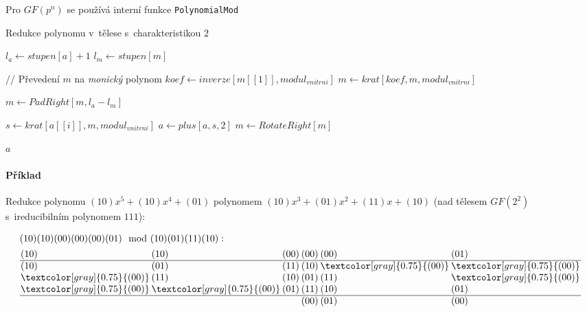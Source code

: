 \documentclass[thesis=M,czech,hidelinks]{FITthesis}[2012/06/26]
\newcommand{\0}{{\textcolor[gray]{0.75}{0}}}
\newenvironment{algoritmus}{
    \floatname{algorithm}{Algoritmus}
    \begin{algorithm}
}{\end{algorithm}}
\begin{document}
Pro $GF(p^n)$ se používá interní funkce \texttt{PolynomialMod}

\begin{algoritmus}[!ht]
    \caption{Redukce polynomu v~tělese s~charakteristikou $2$}
    \begin{algorithmic}[1]
        \State $ l_a \gets stupen[a] + 1 $
        \State $ l_m \gets stupen[m]$

        // Převedení $m$ na \emph{monický} polynom
        \State $ koef \gets inverze[ m[[1]], modul_{vnitrni} ] $
        \State $ m \gets krat[ koef, m, modul_{vnitrni} ] $

        \hfil
        \State $ m \gets PadRight[ m, l_a - l_m ] $

            \State $ s \gets krat[ a[[i]], m, modul_{vnitrni} ] $
            \State $ a \gets plus[ a, s, 2 ] $
            \State $ m \gets RotateRight[m] $
        \EndFor

        \hfil
        \State \Return $a$

     \EndFunction
    \end{algorithmic}
\end{algoritmus}

\paragraph{Příklad} Redukce polynomu $(10)x^5 + (10)x^4 + (01)$
polynomem $(10)x^3 + (01)x^2 + (11)x + (10)$ (nad tělesem $GF(2^2)$
s~ireducibilním polynomem $111$):

\renewcommand{\0}{{\textcolor[gray]{0.75}{(00)}}}
\begin{align*}
&(10)(10)(00)(00)(00)(01) \mod (10)(01)(11)(10) : \\
& \arraycolsep=1pt
\begin{array}{*{6}{l}}
        (10) & (10) & (00) & (00) & (00) & (01) \\
    \hline
        (10) & (01) & (11) & (10) &  \0  &  \0  \\
         \0  & (11) & (10) & (01) & (11) &  \0  \\
         \0  &  \0  & (01) & (11) & (10) & (01) \\
    \hline
             &      &      & (00) & (01) & (00) \\
\end{array}
\end{align*}
\end{document}
